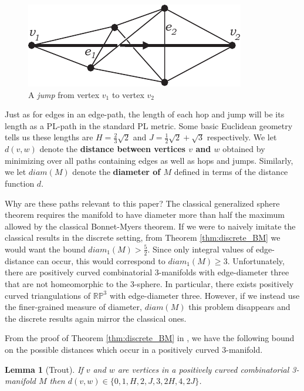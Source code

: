 \documentclass[12pt]{article}
\newtheorem{lem}[thm]{Lemma}
\begin{document}
\begin{figure}
    \label{fig:jump}
    \begin{center}
        \includegraphics[width=0.4\linewidth]{figures/jump.pdf}
        \caption{A {\em jump} from vertex $v_1$ to vertex $v_2$}
    \end{center}
\end{figure}

\noindent Just as for edges in an edge-path, the length of each hop and jump will be its length as a PL-path in the standard PL metric. Some basic Euclidean geometry tells us these lengths are $H = \frac{2}{3}\sqrt{2}$ and $J = \frac{1}{2}\sqrt{2} + \sqrt{3}$ respectively. We let $d(v,w)$ denote the \textbf{distance between vertices $v$ and $w$} obtained by minimizing over all paths containing edges as well as hops and jumps. Similarly, we let $diam(M)$ denote the \textbf{diameter of $M$} defined in terms of the distance function $d$.

Why are these paths relevant to this paper? The classical generalized sphere theorem requires the manifold to have diameter more than half the maximum allowed by the classical Bonnet-Myers theorem. If we were to naively imitate the classical results in the discrete setting, from Theorem \ref{thm:discrete_BM} we would want the bound $diam_1(M)>\frac{5}{2}$. Since only integral values of edge-distance can occur, this would correspond to $diam_1(M)\geq 3$. Unfortunately, there are positively curved combinatorial 3-manifolds with edge-diameter three that are not homeomorphic to the 3-sphere. In particular, there exists positively curved triangulations of $\mathbb{RP}^3$ with edge-diameter three. However, if we instead use the finer-grained measure of diameter, $diam(M)$ this problem disappears and the discrete results again mirror the classical ones.

From the proof of Theorem \ref{thm:discrete_BM} in \cite{Trout10}, we have the following bound on the possible distances which occur in a positively curved 3-manifold.

\begin{lem}[Trout] If $v$ and $w$ are vertices in a positively curved combinatorial 3-manifold $M$ then $d(v,w) \in \{0, 1, H, 2, J, 3, 2H, 4, 2J \}$.
\end{lem}
\end{document}
